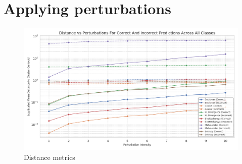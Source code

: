 \section{Applying perturbations}




\begin{figure}[H]
    \centering
    \includegraphics[width=1\linewidth]{Figures/Results/Figures_uncertainty_metrics.png}
    \caption{Distance metrics}
    \label{fig:Figures_uncertainty_metrics}
\end{figure}

